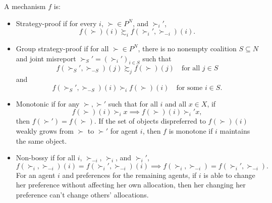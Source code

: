 \begin{definition}
	A mechanism $f$ is:
	\begin{itemize}
		\item Strategy-proof if for every $i$, $\succ \in P^{N}$, and $\succ_i'$, \[
			f(\succ)(i) \succsim_i f\left( \succ_i', \succ_{-i}\right) (i)
		.\] 
		\item Group strategy-proof if for all $\succ \in P^N$, there is no nonempty coalition $S \subseteq N$ and joint misreport $\succ_S' = \left( \succ_i' \right)_{i \in S}$ such that
		\[
			f(\succ_S',\succ_{-S})(j) \succsim_j f(\succ)(j) \quad \text{for all } j \in S
		\]
		and
		\[
			f(\succ_S', \succ_{-S})(i) \succ_i f(\succ)(i) \quad \text{for some } i \in S
		.\] 
		\item Monotonic if for any $\succ,\succ'$ such that for all $i$ and all $x \in X$, if \[
			f(\succ)(i) \succ_i x \implies f(\succ)(i) \succ_i' x
		,\] then $f(\succ') = f(\succ)$.
		If the set of objects dispreferred to $f(\succ)(i)$ weakly grows from $\succ$ to $\succ'$ for agent $i$, then $f$ is monotone if $i$ maintains the same object.
		\item Non-bossy if for all $i$, $\succ_{-i}$, $\succ_i$, and $\succ_i'$, \[
				f(\succ_i,\succ_{-i})(i) = f(\succ_i', \succ_{-i})(i) \implies f(\succ_i, \succ_{-i}) = f(\succ_i', \succ_{-i})
		.\] 
		For an agent $i$ and preferences for the remaining agents, if $i$ is able to change her preference without affecting her own allocation, then her changing her preference can't change others' allocations.
	\end{itemize}
\end{definition}

